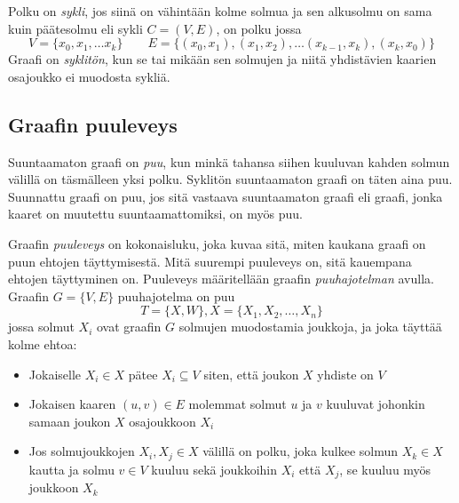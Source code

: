 \begin{center}
\centering
\begin{minipage}{.5\textwidth}
  \centering
\end{minipage}%
\begin{minipage}{.5\textwidth}
  \centering
\end{minipage}
\end{center}


Polku on \emph{sykli}, jos siinä on vähintään kolme solmua ja sen alkusolmu on sama kuin päätesolmu eli sykli $C = (V, E)$, on polku jossa
$$
    V = \{x_0, x_1, \ldots x_k \} \qquad E = \{(x_0, x_1), (x_1,x_2),\ldots(x_{k-1}, x_k), (x_k, x_0)\}
$$
Graafi on \emph{syklitön}, kun se tai mikään sen solmujen ja niitä yhdistävien kaarien osajoukko ei muodosta sykliä.

\subsection{Graafin puuleveys}\label{puuleveys}
Suuntaamaton graafi on \emph{puu}, kun minkä tahansa siihen kuuluvan kahden solmun välillä on täsmälleen yksi polku. Syklitön suuntaamaton graafi on täten aina puu. Suunnattu graafi on puu, jos sitä vastaava suuntaamaton graafi eli graafi, jonka kaaret on muutettu suuntaamattomiksi, on myös puu.

Graafin \emph{puuleveys} \citep{robertson_graph_1984} on kokonaisluku, joka kuvaa sitä, miten kaukana graafi on puun ehtojen täyttymisestä. Mitä suurempi puuleveys on, sitä kauempana ehtojen täyttyminen on. Puuleveys määritellään graafin \emph{puuhajotelman} avulla. Graafin $G = \{ V,E \}$ puuhajotelma on puu 
$$    
    T = \{X, W\}, X = \{X_1, X_2, \ldots , X_n\}
$$
jossa solmut $X_i$ ovat graafin $G$ solmujen muodostamia joukkoja, ja joka täyttää kolme ehtoa:

\begin{itemize}
    \item Jokaiselle $X_i \in X$ pätee $X_i \subseteq V$ siten, että joukon $X$ yhdiste on $V$ \\  
    \item Jokaisen kaaren $( u, v ) \in E$ molemmat solmut $u$ ja $v$ kuuluvat johonkin samaan joukon $X$ osajoukkoon $X_i$ \\
    \item Jos solmujoukkojen $X_i, X_j \in X$ välillä on polku, joka kulkee solmun $X_k \in X$ kautta ja solmu $v \in V$ kuuluu sekä joukkoihin $X_i$ että $X_j$, se kuuluu myös joukkoon $X_k$
\end{itemize}



